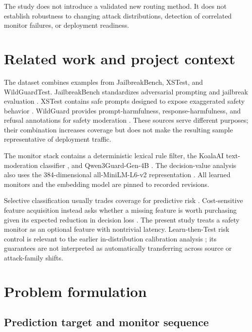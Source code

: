 \documentclass[11pt,a4paper]{article}
\begin{document}
The study does not introduce a validated new routing method. It does not establish robustness to changing attack distributions, detection of correlated monitor failures, or deployment readiness.

\section{Related work and project context}

The dataset combines examples from JailbreakBench, XSTest, and WildGuardTest. JailbreakBench standardizes adversarial prompting and jailbreak evaluation \parencite{chao2024jailbreakbench}. XSTest contains safe prompts designed to expose exaggerated safety behavior \parencite{rottger2024xstest}. WildGuard provides prompt-harmfulness, response-harmfulness, and refusal annotations for safety moderation \parencite{han2024wildguard}. These sources serve different purposes; their combination increases coverage but does not make the resulting sample representative of deployment traffic.

The monitor stack contains a deterministic lexical rule filter, the KoalaAI text-moderation classifier \parencite{koala2023moderation}, and Qwen3Guard-Gen-4B \parencite{zhao2025qwen3guard}. The decision-value analysis also uses the 384-dimensional all-MiniLM-L6-v2 representation \parencite{wang2020minilm,reimers2021allminilm}. All learned monitors and the embedding model are pinned to recorded revisions.

Selective classification usually trades coverage for predictive risk \parencite{elyaniv2010selective}. Cost-sensitive feature acquisition instead asks whether a missing feature is worth purchasing given its expected reduction in decision loss \parencite{bilgic2014voila}. The present study treats a safety monitor as an optional feature with nontrivial latency. Learn-then-Test risk control is relevant to the earlier in-distribution calibration analysis \parencite{angelopoulos2025ltt}; its guarantees are not interpreted as automatically transferring across source or attack-family shifts.

\section{Problem formulation}

\subsection{Prediction target and monitor sequence}
\end{document}
